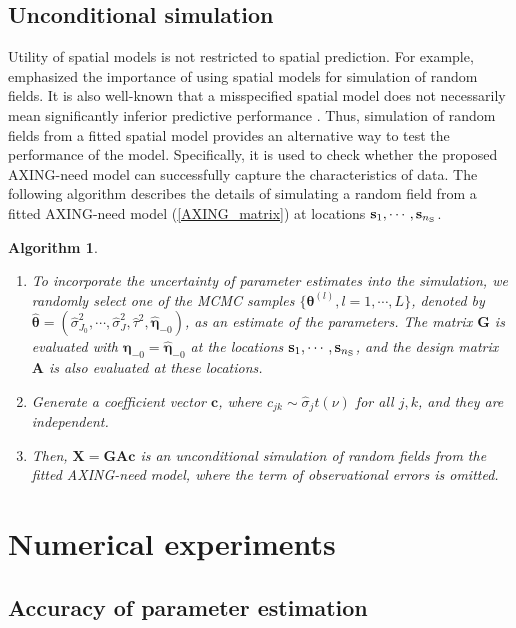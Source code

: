 \documentclass[aoas,preprint]{imsart}
\numberwithin{equation}{section}
\theoremstyle{plain}
\newtheorem{myalg}{Algorithm}[section]
\begin{document}
\subsection{Unconditional simulation}

Utility of spatial models is not restricted to spatial prediction. 
For example, \citet[Section 7.4]{Genton-15} emphasized the importance of using spatial models for simulation of random fields.  It is also well-known that a misspecified spatial model does not necessarily mean significantly inferior predictive performance \citep{Stein-88}. Thus, simulation of random fields from a fitted spatial model provides an alternative way to test the performance of the model. Specifically, it is used to check whether the proposed AXING-need model can successfully capture the characteristics of data. The following algorithm describes the details of simulating a random field from a fitted AXING-need model (\ref{AXING_matrix}) at locations $\mathbf{s}_1, \cdots, \mathbf{s}_{n_{\rm S}}$.
\begin{myalg}\label{alg_sim}
\begin{enumerate}
\item To incorporate the uncertainty of parameter estimates into the simulation, we randomly select one of the MCMC samples $\{ \bm{\theta}^{(l)}, l=1,\cdots, L\}$, denoted by 
$\hat{\bm{\theta}}=(\hat{\sigma}_{J_0}^2, \cdots, \hat{\sigma}_{J}^2, \hat{\tau}^2, \hat{\bm{\eta}}_{-0})$,
as an estimate of the parameters. The matrix $\mathbf{G}$ is evaluated with $\bm{\eta}_{-0}=\hat{\bm{\eta}}_{-0}$ at the locations $\mathbf{s}_1, \cdots, \mathbf{s}_{n_{\rm S}}$, and the design matrix $\mathbf{A}$ is also evaluated at these locations.
\item Generate a coefficient vector $\mathbf{c}$, where $c_{jk} \sim \hat{\sigma}_j t(\nu)$ for all $j, k$, and they are independent.
\item Then, $\mathbf{X}=\mathbf{G}\mathbf{A}\mathbf{c}$ is an unconditional simulation of random fields from the fitted AXING-need model, where the term of observational errors is omitted.
\end{enumerate}
\end{myalg}

\section{Numerical experiments}\label{sec:num_exp}
\subsection{Accuracy of parameter estimation}\label{sec:acc_param}
\end{document}
